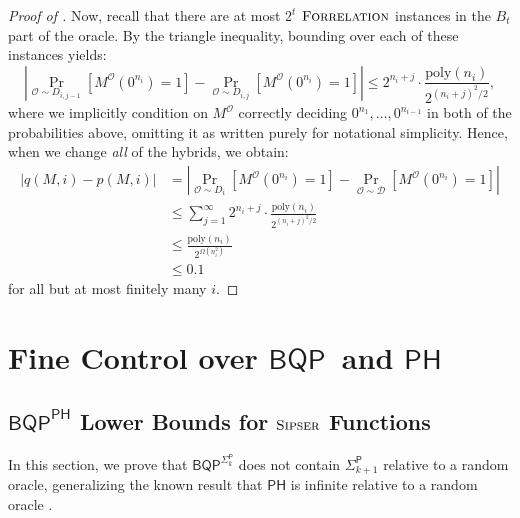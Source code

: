\documentclass[10pt,a4paper]{article}
\newcommand{\poly}{\mathrm{poly}}
\newcommand{\Sipser}{\normalfont\textsc{Sipser}}
\newcommand{\Forrelation}{\normalfont\textsc{Forrelation}}
\begin{document}
\begin{proof}[Proof of ]
Now, recall that there are at most $2^{t}$ $\Forrelation$ instances in the $B_t$ part of the oracle. By the triangle inequality, bounding over each of these instances yields:
\[
\left|\Pr_{\mathcal{O} \sim D_{i, j-1}}\left[M^\mathcal{O}\left(0^{n_i}\right) = 1\right]-\Pr_{\mathcal{O} \sim D_{i, j}}\left[M^\mathcal{O}\left(0^{n_i}\right) = 1 \right]\right| \le 2^{n_i + j} \cdot \frac{\poly(n_i)}{2^{(n_i+j)^2/2}},
\]
where we implicitly condition on $M^\mathcal{O}$ correctly deciding $0^{n_1},\dots,0^{n_{i-1}}$ in both of the probabilities above, omitting it as written purely for notational simplicity. Hence, when we change \textit{all} of the hybrids, we obtain:
\begin{align*}
|q(M, i) - p(M, i)| &= \left|\Pr_{\mathcal{O} \sim D_i}\left[M^\mathcal{O}\left(0^{n_i}\right) = 1\right]-\Pr_{\mathcal{O} \sim \mathcal{D}}\left[M^\mathcal{O}\left(0^{n_i}\right) = 1 \right]\right|\\
&\le \sum_{j=1}^\infty 2^{n_i + j} \cdot \frac{\poly(n_i)}{2^{(n_i + j)^2 / 2}}\\
&\le \frac{\poly(n_i)}{2^{\Omega\left(n_i^2\right)}}\\
&\le 0.1
\end{align*}
for all but at most finitely many $i$.
\end{proof}


\section{Fine Control over \texorpdfstring{$\mathsf{BQP}$}{BQP}\ and \texorpdfstring{$\mathsf{PH}$}{PH}}
\subsection{\texorpdfstring{$\mathsf{BQP}^{\mathsf{PH}}$}{BQP\^{}PH} Lower Bounds for \texorpdfstring{$\Sipser$}{Sipser} Functions}
In this section, we prove that $\mathsf{BQP}^{\mathsf{\Sigma}_k^\mathsf{P}}$ does not contain $\mathsf{\Sigma}_{k+1}^\mathsf{P}$ relative to a random oracle, generalizing the known result that $\mathsf{PH}$ is infinite relative to a random oracle \cite{HRST17,RST15}.
\end{document}
